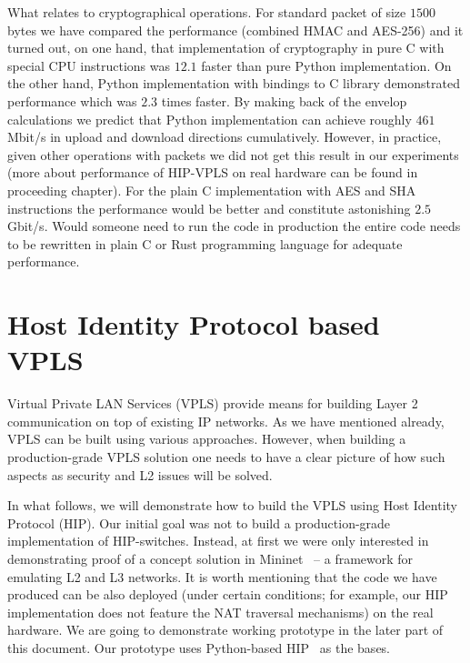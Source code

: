 What relates to cryptographical operations. For standard packet of size $1500$ 
bytes we have compared the performance (combined HMAC and AES-256) and it turned 
out, on one hand, that implementation of cryptography in pure C with special CPU instructions was 
$12.1$ faster than pure Python implementation. On the other hand, Python implementation with bindings
to C library demonstrated performance which was $2.3$ times faster. By making back of the envelop calculations
we predict that Python implementation can achieve roughly $461$ Mbit/s in upload and download directions
cumulatively. However, in practice, given other operations with packets we did not get this result 
in our experiments (more about performance of HIP-VPLS on real hardware can be found in proceeding 
chapter). For the plain C implementation with AES and SHA instructions the performance would be 
better and constitute astonishing $2.5$ Gbit/s. Would someone need to run the code in production
the entire code needs to be rewritten in plain C or Rust programming language for adequate performance.

\section{Host Identity Protocol based VPLS}

Virtual Private LAN Services (VPLS) provide means for building Layer 2 communication 
on top of existing IP networks. As we have mentioned already, VPLS can be built using various approaches. However, 
when building a production-grade VPLS solution one needs to have a clear picture of 
how such aspects as security and L2 issues will be solved.

In what follows, we will demonstrate how to build the VPLS using Host Identity Protocol (HIP). 
Our initial goal was not to build a production-grade implementation of HIP-switches. Instead, 
at first we were only interested in demonstrating proof of a concept solution in 
Mininet~\cite{mininet} – a framework for emulating L2 and L3 networks. It is worth mentioning that the code 
we have produced can be also deployed (under certain conditions; for example, our HIP implementation 
does not feature the NAT traversal mechanisms) on the real hardware. We are going to demonstrate 
working prototype in the later part of this document. Our prototype uses Python-based HIP~\cite{pyhip} 
as the bases.

